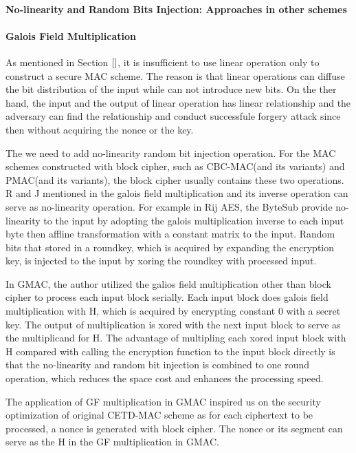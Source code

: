 \paragraph{No-linearity and Random Bits Injection: Approaches in other schemes}
\paragraph{Galois Field Multiplication}
As mentioned in Section $\ref{}$, it is insufficient to use linear operation
only to construct a secure MAC scheme. The reason is that linear operations can
diffuse the bit distribution of the input while can not introduce new bits. On
the ther hand, the input and the output of linear operation has linear
relationship and the adversary can find the relationship and conduct successfule
forgery attack since then without acquiring the nonce or the key.

The we need to add no-linearity random bit injection operation. For the MAC
schemes constructed with block cipher, such as CBC-MAC(and its variants) and
PMAC(and its variants), the block cipher usually contains these two operations.
R and J mentioned in \cite{} the galois field multiplication and its inverse
operation can serve as no-linearity operation. 
For example in Rij AES, the ByteSub provide no-linearity to the input by
adopting the galois multiplication inverse to each input byte then affline
transformation with a constant matrix to the input. Random bits that stored in a
roundkey, which is acquired by expanding the encryption key, is injected to the
input by xoring the roundkey with processed input.  

In GMAC, the author utilized the galios field multiplication other than block
cipher to process each input block serially. Each input block does galois field
multiplication with H, which is acquired by encrypting constant 0 with a secret
key. The output of multiplication is xored with the next input block to serve as
the multiplicand for H. The advantage of multipling each xored input block with
H compared with calling the encryption function to the input block directly is
that the no-linearity and random bit injection is combined to one round
operation, which reduces the space cost and enhances the processing speed.

The application of GF multiplication in GMAC inspired us on the security
optimization of original CETD-MAC scheme as for each ciphertext to be processed,
a nonce is generated with block cipher. The nonce or its segment can serve as
the H in the GF multiplication in GMAC. 
